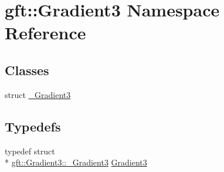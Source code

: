 \hypertarget{namespacegft_1_1Gradient3}{\section{gft\-:\-:Gradient3 Namespace Reference}
\label{namespacegft_1_1Gradient3}
}
\subsection*{Classes}
\begin{DoxyCompactItemize}
\item 
struct \hyperlink{structgft_1_1Gradient3_1_1__Gradient3}{\-\_\-\-Gradient3}
\end{DoxyCompactItemize}
\subsection*{Typedefs}
\begin{DoxyCompactItemize}
\item 
typedef struct \\*
\hyperlink{structgft_1_1Gradient3_1_1__Gradient3}{gft\-::\-Gradient3\-::\-\_\-\-Gradient3} \hyperlink{namespacegft_1_1Gradient3_acc3ba84d5f1e1fd680f64f29da6ac0eb}{Gradient3}
\end{DoxyCompactItemize}
